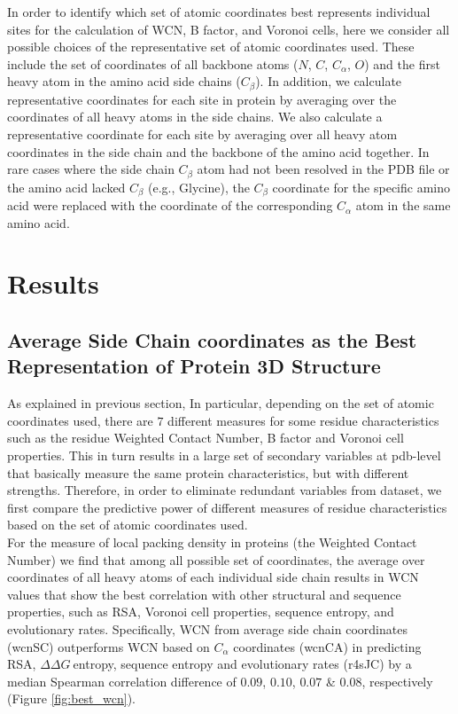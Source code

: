 \documentclass[11pt]{article}
\newcommand{\ddg}{$\Delta\Delta G~$}
\begin{document}
        In order to identify which set of atomic coordinates best represents individual sites for the calculation of WCN, B factor, and Voronoi cells, here we consider all possible choices of the representative set of atomic coordinates used. These include the set of coordinates of all backbone atoms ($N$, $C$, $C_\alpha$, $O$) and the first heavy atom in the amino acid side chains ($C_\beta$). In addition, we calculate representative coordinates for each site in protein by averaging over the coordinates of all heavy atoms in the side chains. We also calculate a representative coordinate for each site by averaging over all heavy atom coordinates in the side chain and the backbone of the amino acid together. In rare cases where the side chain $C_\beta$ atom had not been resolved in the PDB file or the amino acid lacked $C_\beta$ (e.g., Glycine), the $C_\beta$ coordinate for the specific amino acid were replaced with the coordinate of the corresponding $C_\alpha$ atom in the same amino acid. \\


\section{Results}
\label{sec:results}

    \subsection*{Average Side Chain coordinates as the Best Representation of Protein 3D Structure}

        As explained in previous section, In particular, depending on the set of atomic coordinates used, there are $7$ different measures for some residue characteristics such as the residue Weighted Contact Number, B factor and Voronoi cell properties. This in turn results in a large set of secondary variables at pdb-level that basically measure the same protein characteristics, but with different strengths.  Therefore, in order to eliminate redundant variables from dataset, we first compare the predictive power of different measures of residue characteristics based on the set of atomic coordinates used.
        \\

        For the measure of local packing density in proteins (the Weighted Contact Number) we find that among all possible set of coordinates, the average over coordinates of all heavy atoms of each individual side chain results in WCN values that show the best correlation with other structural and sequence properties, such as RSA, Voronoi cell properties, sequence entropy, and evolutionary rates. Specifically, WCN from average side chain coordinates (wcnSC) outperforms WCN based on $C_\alpha$ coordinates (wcnCA) in predicting RSA, \ddg entropy, sequence entropy and evolutionary rates (r4sJC) by a median Spearman correlation difference of $0.09$, $0.10$, $0.07$ \& $0.08$, respectively (Figure \ref{fig:best_wcn}).
        \\
\end{document}
